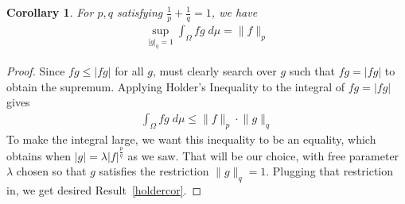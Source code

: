 \documentclass[12pt]{article}
\theoremstyle{plain}
\newtheorem{cor}[thm]{Corollary}
\theoremstyle{definition}
\theoremstyle{remark}
\begin{document}
\clearpage
\begin{cor}
For $p,q$ satisfying
$\frac{1}{p}+\frac{1}{q}=1$, we have
\begin{align}
    \sup_{\lvert g\rvert_{q}=1}
    \int_\Omega fg \; d\mu = \lVert f\rVert_p
    \label{holdercor}
\end{align}
\end{cor}
\begin{proof}
Since $fg\leq |fg|$ for all $g$, must clearly search over $g$ such that
$fg=|fg|$ to obtain the supremum.
Applying Holder's Inequality to the integral of $fg=|fg|$ gives
\begin{align*}
  \int_\Omega fg \; d\mu \leq
  \lVert f\rVert_p \cdot \lVert g\rVert_{q}
\end{align*}
To make the integral large, we want this inequality to be an equality,
which obtains when $|g|=\lambda |f|^{\frac{p}{q}}$ as we saw.
That will be our choice, with free parameter $\lambda$ chosen so that
$g$ satisfies the restriction $\lVert g\rVert_q=1$. Plugging that
restriction in, we get desired Result~\ref{holdercor}.
\end{proof}
\end{document}
